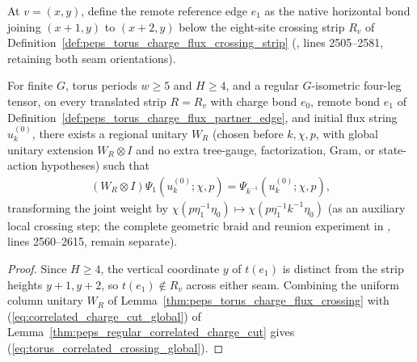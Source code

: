 \begin{definition}
    \label{def:peps_torus_charge_flux_partner_edge}
    \leanok
    At $v=(x,y)$, define the remote reference edge $e_1$ as the native horizontal bond joining $(x+1,y)$ to $(x+2,y)$ below the eight-site crossing strip $R_v$ of Definition~\ref{def:peps_torus_charge_flux_crossing_strip} (\cite{Schuch2010PEPS}, lines 2505--2581, retaining both seam orientations).
\end{definition}

\begin{lemma}
    \label{thm:peps_torus_correlated_charge_flux_crossing_global}
    \leanok
    For finite $G$, torus periods $w\ge 5$ and $H\ge 4$, and a regular $G$-isometric four-leg tensor, on every translated strip $R=R_v$ with charge bond $e_0$, remote bond $e_1$ of Definition~\ref{def:peps_torus_charge_flux_partner_edge}, and initial flux string $u^{(0)}_k$, there exists a regional unitary $W_R$ (chosen before $k,\chi,p$, with global unitary extension $W_R\otimes I$ and no extra tree-gauge, factorization, Gram, or state-action hypotheses) such that
    \begin{align}
        (W_R\otimes I)\Psi_1(u^{(0)}_k;\chi,p)
        =\Psi_{k^{-1}}(u^{(0)}_k;\chi,p), \label{eq:torus_correlated_crossing_global}
    \end{align}
    transforming the joint weight by $\chi(p\eta_1^{-1}\eta_0)\mapsto\chi(p\eta_1^{-1}k^{-1}\eta_0)$ (as an auxiliary local crossing step; the complete geometric braid and reunion experiment in \cite{Schuch2010PEPS}, lines 2560--2615, remain separate).
\end{lemma}
\begin{proof}\leanok
    Since $H\ge 4$, the vertical coordinate $y$ of $t(e_1)$ is distinct from the strip heights $y+1,y+2$, so $t(e_1)\notin R_v$ across either seam.
    Combining the uniform column unitary $W_R$ of Lemma~\ref{thm:peps_torus_charge_flux_crossing} with (\ref{eq:correlated_charge_cut_global}) of Lemma~\ref{thm:peps_regular_correlated_charge_cut} gives (\ref{eq:torus_correlated_crossing_global}).
\end{proof}
